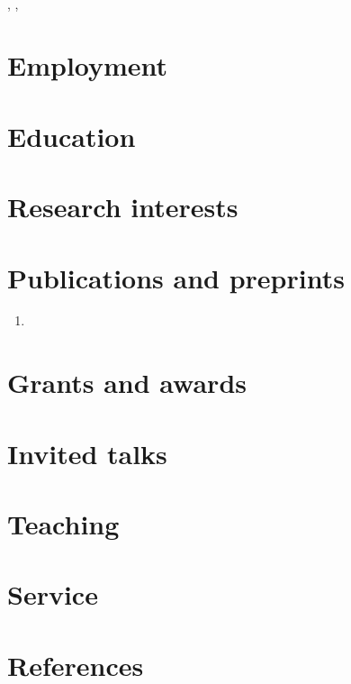\documentclass[11pt]{article}
\begin{document}
\begin{center}
  {\LARGE\bfseries \myname}\\[0.4em]
  \mytitle, \mydept, \myinstitution\\
  \href{mailto:\myemail}{\myemail} \quad \mywebsite
\end{center}

\section{Employment}

\section{Education}

\section{Research interests}

\section{Publications and preprints}
\begin{enumerate}
  \item
\end{enumerate}

\section{Grants and awards}

\section{Invited talks}

\section{Teaching}

\section{Service}

\section{References}
\end{document}
